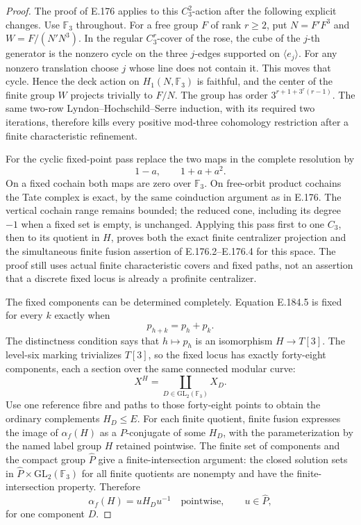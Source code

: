 \begin{proof}
The proof of E.176 applies to this \(C_3^2\)-action after
the following explicit changes.  Use \(\mathbb F_3\)
throughout.  For a free group \(F\) of rank \(r\geq2\),
put \(N=F'F^3\) and \(W=F/(N'N^3)\).
In the regular \(C_3^r\)-cover of the rose, the cube of
the \(j\)-th generator is the nonzero cycle on the three
\(j\)-edges supported on \(\langle e_j\rangle\).
For any nonzero translation choose \(j\) whose line does
not contain it.  This moves that cycle.  Hence the deck
action on \(H_1(N,\mathbb F_3)\) is faithful, and the
center of the finite group \(W\) projects trivially to
\(F/N\).  The group has order
\(3^{r+1+3^r(r-1)}\).
The same two-row Lyndon--Hochschild--Serre induction,
with its required two iterations, therefore kills every
positive mod-three cohomology restriction after a finite
characteristic refinement.

For the cyclic fixed-point pass replace the two maps in
the complete resolution by
\[
                    1-a,\qquad 1+a+a^2.
\tag{E.184.6}
\]
On a fixed cochain both maps are zero over \(\mathbb F_3\).
On free-orbit product cochains the Tate complex is exact,
by the same coinduction argument as in E.176.
The vertical cochain range remains bounded; the reduced
cone, including its degree \(-1\) when a fixed set is
empty, is unchanged.  Applying this pass first to one
\(C_3\), then to its quotient in \(H\), proves both
the exact finite centralizer projection and the simultaneous
finite fusion assertion of E.176.2--E.176.4 for this space.
The proof still uses actual finite characteristic covers
and fixed paths, not an assertion that a discrete fixed
locus is already a profinite centralizer.

The fixed components can be determined completely.
Equation E.184.5 is fixed for every \(k\) exactly when
\[
                         p_{h+k}=p_h+p_k.
\tag{E.184.7}
\]
The distinctness condition says that \(h\mapsto p_h\)
is an isomorphism \(H\to T[3]\).
The level-six marking trivializes \(T[3]\), so the
fixed locus has exactly forty-eight components, each
a section over the same connected modular curve:
\[
                          X^H=\coprod_{D\in\mathrm{GL}_2(\mathbb F_3)}X_D.
\tag{E.184.8}
\]
Use one reference fibre and paths to those forty-eight
points to obtain the ordinary complements \(H_D\leq E\).
For each finite quotient, finite fusion expresses the
image of \(\alpha_f(H)\) as a \(P\)-conjugate of some
\(H_D\), with the parameterization by the named label
group \(H\) retained pointwise.
The finite set of components and the compact group
\(\widehat P\) give a finite-intersection argument:
the closed solution sets in
\(\widehat P\times\mathrm{GL}_2(\mathbb F_3)\)
for all finite quotients are nonempty and have the
finite-intersection property.  Therefore
\[
                    \alpha_f(H)=uH_Du^{-1}
                  \quad\text{pointwise},\qquad u\in\widehat P,
\tag{E.184.9}
\]
for one component \(D\).


\end{proof}
